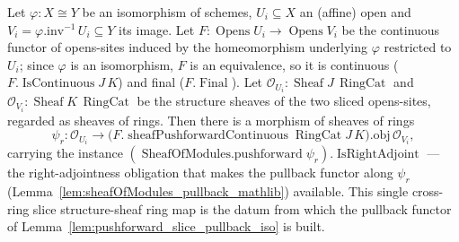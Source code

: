 \begin{lemma}
  \label{lem:slice_structureSheaf_hom}
  Let \(\varphi : X \cong Y\) be an isomorphism of schemes, \(U_i \subseteq X\) an (affine) open and
  \(V_i = \varphi.\mathrm{inv}^{-1}\,U_i \subseteq Y\) its image. Let \(F : \operatorname{Opens} U_i \to
  \operatorname{Opens} V_i\) be the continuous functor of opens-sites induced by the homeomorphism
  underlying \(\varphi\) restricted to \(U_i\); since \(\varphi\) is an isomorphism, \(F\) is an
  equivalence, so it is continuous (\(F.\operatorname{IsContinuous} J\,K\)) and final
  (\(F.\operatorname{Final}\)). Let \(\mathcal{O}_{U_i} : \operatorname{Sheaf} J\,\operatorname{RingCat}\)
  and \(\mathcal{O}_{V_i} : \operatorname{Sheaf} K\,\operatorname{RingCat}\) be the structure sheaves of
  the two sliced opens-sites, regarded as sheaves of rings. Then there is a morphism of sheaves of rings
  \[
    \psi_r : \mathcal{O}_{U_i} \longrightarrow
      \bigl(F.\operatorname{sheafPushforwardContinuous} \operatorname{RingCat} J\,K\bigr).\mathrm{obj}\,
      \mathcal{O}_{V_i},
  \]
  carrying the instance \((\operatorname{SheafOfModules.pushforward}\psi_r).\operatorname{IsRightAdjoint}\)
  — the right-adjointness obligation that makes the pullback functor along \(\psi_r\)
  (Lemma~\ref{lem:sheafOfModules_pullback_mathlib}) available. This single cross-ring slice
  structure-sheaf ring map is the datum from which the pullback functor of
  Lemma~\ref{lem:pushforward_slice_pullback_iso} is built.
\end{lemma}
